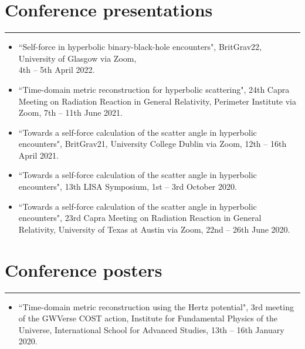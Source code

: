 \documentclass[10.5pt, oneside]{article}   	%
\begin{document}
 
 {\color{Sectioncolour}
\section*{Conference presentations}
\vspace{-3mm}
\noindent\rule{\linewidth}{0.6pt}}
\begin{itemize}
\item ``Self-force in hyperbolic binary-black-hole encounters", BritGrav22, University of Glasgow via Zoom, \\ 4th -- 5th April 2022. \href{https://www.youtube.com/watch?v=zZEblkjb5IM}{}
\item ``Time-domain metric reconstruction for hyperbolic scattering", 24th Capra Meeting on Radiation Reaction in General Relativity, Perimeter Institute via Zoom, 7th -- 11th June 2021. \href{https://pirsa.org/21060058}{}
\item ``Towards a self-force calculation of the scatter angle in hyperbolic encounters", BritGrav21, University College Dublin via Zoom, 12th -- 16th April 2021.
\item``Towards a self-force calculation of the scatter angle in hyperbolic encounters", 13th LISA Symposium, 1st -- 3rd October 2020. \href{https://lisasymposium13.lisamission.org/presentations/i0xMnRFWi7WKbO5f01caGDH0zPK2/7qz7uYC3qHuzj9AsC49h}{}
\item ``Towards a self-force calculation of the scatter angle in hyperbolic encounters", 23rd Capra Meeting on Radiation Reaction in General Relativity, University of Texas at Austin via Zoom, 22nd -- 26th June 2020. \href{https://www.youtube.com/watch?v=HB-Rw5kRUfg&t=11311s}{}
\end{itemize} 
 
{\color{Sectioncolour}
\section*{Conference posters}
\vspace{-3mm}
\noindent\rule{\linewidth}{0.6pt}}
\begin{itemize}
\item ``Time-domain metric reconstruction using the Hertz potential", 3rd meeting of the GWVerse COST action, Institute for Fundamental Physics of the Universe, International School for Advanced Studies, 13th -- 16th January 2020.
\end{itemize} 
\end{document}
